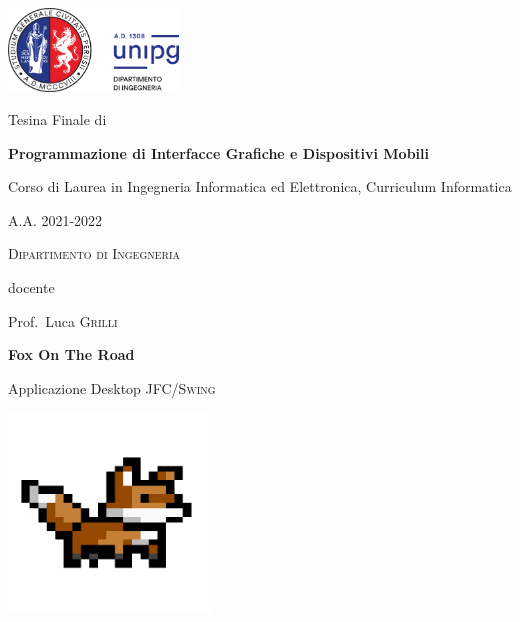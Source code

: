 \documentclass[12pt,a4paper]{report}
\begin{document}
\begin{titlepage}
	\centering
	\includegraphics[width=0.34\textwidth]{logo-unipg}\par\vspace{1cm}
	\large{Tesina Finale di}\par
	\large{\textbf{Programmazione di Interfacce Grafiche e Dispositivi Mobili}}\par
	\small{Corso di Laurea in Ingegneria Informatica ed Elettronica, Curriculum Informatica} 
	
	\small{A.A. 2021-2022} \par
	\textsc{\small{Dipartimento di Ingegneria}}\par

	\vspace{0.5cm}
	docente\par
	Prof.~Luca \textsc{Grilli}

	\vspace{1cm}
	\vspace{1cm}
	\textbf{\huge{Fox On The Road}}\par
	\vspace{0.2cm}
	Applicazione Desktop \textsc{JFC/Swing}\par
	\vspace{0.5cm}
	\includegraphics[width=0.40\textwidth]{FoxOnTheRoad_Logo}\par\vspace{1cm}
	\vspace{1cm}


\end{titlepage}
\end{document}

